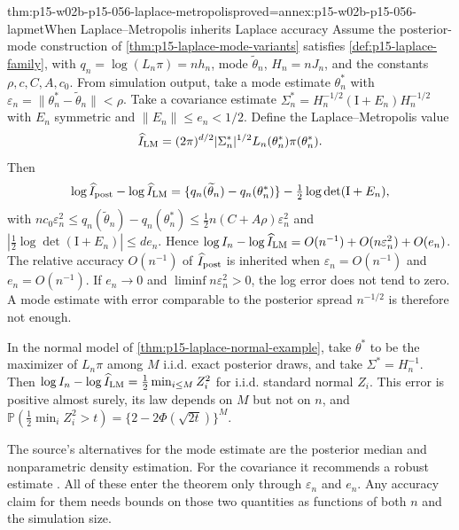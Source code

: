 \begin{hbtheorem}{thm:p15-w02b-p15-056-laplace-metropolis}{proved=annex:p15-w02b-p15-056-lapmet}{When Laplace--Metropolis inherits Laplace accuracy}
Assume the posterior-mode construction of
\cref{thm:p15-laplace-mode-variants} satisfies
\cref{def:p15-laplace-family}, with \(q_n=\log(L_n\pi)=nh_n\), mode
\(\widetilde\theta_n\), \(H_n=nJ_n\), and the constants
\(\rho,c,C,A,c_0\). From simulation output, take a mode estimate
\(\theta^*_n\) with \(\varepsilon_n=\|\theta^*_n-\widetilde\theta_n\|<\rho\).
Take a covariance estimate
\(\Sigma^*_n=H_n^{-1/2}(\mathrm{I}+E_n)H_n^{-1/2}\) with \(E_n\)
symmetric and \(\|E_n\|\leq e_n<1/2\). Define the Laplace--Metropolis
value
\[
 \widehat I_{\rm LM}=(2\pi)^{d/2}|\Sigma^*_n|^{1/2}
 L_n(\theta^*_n)\pi(\theta^*_n).
\]
Then
\[
 \log\widehat I_{\rm post}-\log\widehat I_{\rm LM}
 =\{q_n(\widetilde\theta_n)-q_n(\theta^*_n)\}-\tfrac12\log\det(\mathrm{I}+E_n),
\]
with
\(nc_0\varepsilon_n^2\leq q_n(\widetilde\theta_n)-q_n(\theta^*_n)
 \leq\tfrac12n(C+A\rho)\varepsilon_n^2\) and
\(|\tfrac12\log\det(\mathrm{I}+E_n)|\leq de_n\). Hence
\(\log I_n-\log\widehat I_{\rm LM}=O(n^{-1})+O(n\varepsilon_n^2)+O(e_n)\).
The relative accuracy \(O(n^{-1})\) of \(\widehat I_{\rm post}\) is
inherited when \(\varepsilon_n=O(n^{-1})\) and \(e_n=O(n^{-1})\). If
\(e_n\to0\) and \(\liminf n\varepsilon_n^2>0\), the log error does not
tend to zero. A mode estimate with error comparable to the posterior
spread \(n^{-1/2}\) is therefore not enough.

In the normal model of \cref{thm:p15-laplace-normal-example}, take
\(\theta^*\) to be the maximizer of \(L_n\pi\) among \(M\) i.i.d. exact
posterior draws, and take \(\Sigma^*=H_n^{-1}\). Then
\(\log I_n-\log\widehat I_{\rm LM}=\tfrac12\min_{i\leq M}Z_i^2\) for
i.i.d. standard normal \(Z_i\). This error is positive almost surely, its
law depends on \(M\) but not on \(n\), and
\(\mathbb P(\tfrac12\min_iZ_i^2>t)=\{2-2\Phi(\sqrt{2t})\}^M\).
\end{hbtheorem}

The source's alternatives for the mode estimate are the posterior median
and nonparametric density estimation. For the covariance it recommends a
robust estimate \cite[Sec.~4.3, p.~780]{KassRaftery1995BayesFactors}.
All of these enter the theorem only through \(\varepsilon_n\) and
\(e_n\). Any accuracy claim for them needs bounds on those two quantities
as functions of both \(n\) and the simulation size.

